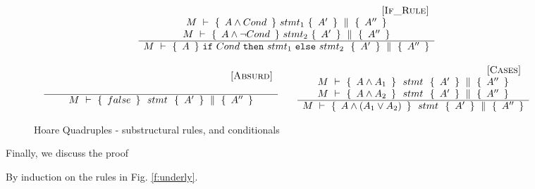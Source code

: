 \begin{figure}[htb]
 $
\begin{array}{c}
\inferruleSD{\hspace{2.5cm} [\sc{If\_Rule}]}
	{
	 \begin{array}{c}
	  \hprovesN {M}   
		{\  A \wedge Cond \  }
		{\    stmt_1   \ }
 		{\ A' \ }
		{\ A'' \ }
	\\
	    \hprovesN {M}   
		{\  A \wedge \neg Cond \  }
		{\    stmt_2   \ }
 		{\ A' \ }
		{\ A'' \ }	
	\end{array}
	}	
 	{  	
	\hprovesN {M}   
		{\  A \  }
		{\  \prg{if}\ Cond\ \prg{then}\ stmt_1\ \prg{else}\ stmt_2 \ \ }
		{\ A' \ }
		{\ A'' \ }
}
\\
\\
\begin{array}{lcl}
{
\inferruleSD{\hspace{0.5cm} [\sc{Absurd}]}
	{	
	}	 
 	{  	
	\hprovesN {M}   
		{\  false \  }
		{\  \ stmt \ \ }
		{\ A' \ }
		{\ A'' \ }
}
} & &
{
\inferruleSD{\hspace{0.5cm} [\sc{Cases}]}
	{ \begin{array}{l}
	\hprovesN {M}   
		{\  A \wedge A_{1}  \  }
		{\  \ stmt \ \ }
		{\ A' \ }
		{\ A'' \ }
		\\
		\hprovesN {M}   
		{\   A \wedge A_{2} \  }
		{\  \ stmt \ \ }
		{\ A' \ }
		{\ A'' \ }
	\end{array}	
	}	 
 	{  	
	\hprovesN {M}   
		{\  A \wedge (A_1 \vee A_2) \  }
		{\  \ stmt \ \ }
		{\ A' \ }
		{\ A'' \ }
}
}
\end{array}
\end{array}
$
 \vspace{-.5cm}
\caption{Hoare Quadruples -    substructural rules, and conditionals }
\label{f:substructural:app}
\end{figure}

%

\vspace{1cm} Finally, we discuss the proof

By induction on the rules in Fig. \ref{f:underly}.

\completeProof 
 
